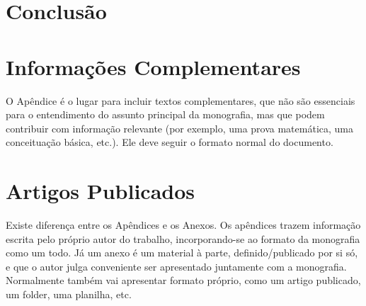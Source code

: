 \documentclass[twoside,english,brazilian]{UNISINOSmonografia}
\begin{document}

\chapter{Conclusão}




\appendix
\chapter{Informações Complementares}

O Apêndice é o lugar para incluir textos complementares, que não são essenciais para o entendimento do assunto principal da monografia, mas que podem contribuir com informação relevante (por exemplo, uma prova matemática, uma conceituação básica, etc.).  Ele deve seguir o formato normal do documento.

\annex
\chapter{Artigos Publicados}
Existe diferença entre os Apêndices e os Anexos.  Os apêndices trazem informação escrita pelo próprio autor do trabalho, incorporando-se ao formato da monografia como um todo.  Já um anexo é um material à parte, definido/publicado por si só, e que o autor julga conveniente ser apresentado juntamente com a monografia.  Normalmente também vai apresentar formato próprio, como um artigo publicado, um folder, uma planilha, etc.
\end{document}
